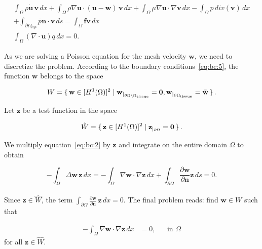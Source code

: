 \documentclass[a4paper,11pt,openright,twoside]{book}
\begin{document}
\begin{equation}
\label{eq:ns:5}
\begin{split}
\int_{\Omega} \rho \dot{\mathbf{u}} \, \mathbf{v} \, dx
+ \int_{\Omega} \rho \nabla \mathbf{u} \cdot (\mathbf{u} - \mathbf{w}) \, \mathbf{v} \, dx
+ \int_{\Omega} \mu \nabla \mathbf{u} \cdot \nabla \mathbf{v} \, dx 
- \int_{\Omega} p \, div(\mathbf{v}) \, dx \\
+ \int_{\partial \Omega_{top}} \bar{p} \mathbf{n} \cdot \mathbf{v} \, ds
 =  \int_{\Omega} \mathbf{f} \mathbf{v} \, dx \\
\int_{\Omega}  (\nabla \cdot \mathbf{u}) q \, dx = 0.
\end{split}
\end{equation}


As we are solving a Poisson equation for the mesh velocity $\mathbf{w}$, we need to discretize the problem. According to the boundary conditions~\eqref{eq:bc:5}, the function $\mathbf{w}$ belongs to the space

\begin{equation}
W = \set{\mathbf{w} \in [H^1(\Omega)]^2 | \mathbf{w}_{|_{\partial \Omega \setminus \Omega_{\rm tissue}}} = \mathbf{0}, \mathbf{w}_{|_{\partial \Omega_{\rm tissue} } }  = \bar{\mathbf{w}} }.
\end{equation}

Let $\mathbf{z}$ be a test function in the space

\begin{equation}
\hat{W} = \set{\mathbf{z} \in [H^1(\Omega)]^2 | \mathbf{z}_{|_{\partial \Omega}} = \mathbf{0}}.
\end{equation}


We multiply equation~\eqref{eq:bc:2} by $\mathbf{z}$ and integrate on the entire domain $\Omega$ to obtain

\begin{equation}
\label{eq:bc:4}
- \int_{\Omega} \Delta \mathbf{w} \, \mathbf{z} \, dx
= - \int_{\Omega} \nabla \mathbf{w} \cdot \nabla \mathbf{z} \, dx
+ \int_{\partial \Omega} \frac{\partial \mathbf{w}}{\partial \mathbf{n}} \mathbf{z} \, ds = 0.
\end{equation}
\\
Since $\mathbf{z} \in \hat{W}$, the term $\int_{\partial \Omega} \frac{\partial \mathbf{w}}{\partial \mathbf{n}} \, \mathbf{z} \, dx  = 0$. The final problem reads: find $\mathbf{w} \in W$ such that

\begin{align}
-  \int_{\Omega} \nabla \mathbf{w} \cdot \nabla \mathbf{z} \, dx &= 0, && \text{in } \Omega
\end{align}
for all $ \mathbf{z} \in \hat{W}$.
\end{document}
